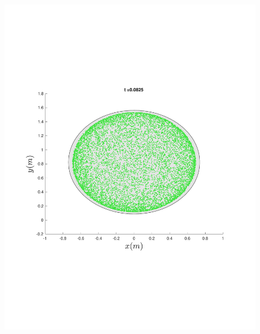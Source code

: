 \begin{figure}
{\begin{minipage}{0.5\textwidth}
\begin{minipage}[b]{0.5\textwidth}
        \includegraphics[width=\textwidth]{figures/method/FunnelSimOverlaid12funnel-1}
      \end{minipage}%
      \begin{minipage}[b]{0.5\textwidth}

\end{minipage}
\end{minipage}}
\end{figure}
